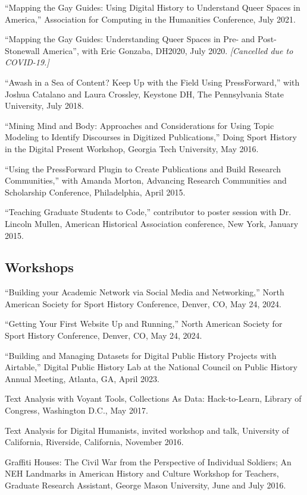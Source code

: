 \documentclass[11pt]{article}
\begin{document}
``Mapping the Gay Guides: Using Digital History to Understand Queer Spaces in America,'' Association for Computing in the Humanities Conference, July 2021.

``Mapping the Gay Guides: Understanding Queer Spaces in Pre- and Post-Stonewall America'', with Eric Gonzaba, DH2020, July 2020. \emph{[Cancelled due to COVID-19.]}

``Awash in a Sea of Content? Keep Up with the Field Using PressForward,'' with Joshua Catalano and Laura Crossley, Keystone DH, The Pennsylvania State University, July 2018.

``Mining Mind and Body: Approaches and Considerations for Using Topic Modeling to Identify Discourses in Digitized Publications,'' Doing Sport History in the Digital Present Workshop, Georgia Tech University, May 2016.

``Using the PressForward Plugin to Create Publications and Build Research Communities,'' with Amanda Morton, Advancing Research Communities and Scholarship Conference, Philadelphia, April 2015.

``Teaching Graduate Students to Code,'' contributor to poster session with Dr. Lincoln Mullen, American Historical Association conference, New York, January 2015.

\subsection{Workshops}
``Building your Academic Network via Social Media and Networking,'' North American Society for Sport History Conference, Denver, CO, May 24, 2024.

``Getting Your First Website Up and Running,'' North American Society for Sport History Conference, Denver, CO, May 24, 2024.

``Building and Managing Datasets for Digital Public History Projects with Airtable,'' Digital Public History Lab at the National Council on Public History Annual Meeting, Atlanta, GA, April 2023. 

Text Analysis with Voyant Tools, Collections As Data: Hack-to-Learn, Library of Congress, Washington D.C., May 2017.

Text Analysis for Digital Humanists, invited workshop and talk, University of California, Riverside, California, November 2016.

Graffiti Houses: The Civil War from the Perspective of Individual Soldiers; An NEH Landmarks in American History and Culture Workshop for Teachers, Graduate Research Assistant, George Mason University, June and July 2016.
\end{document}
